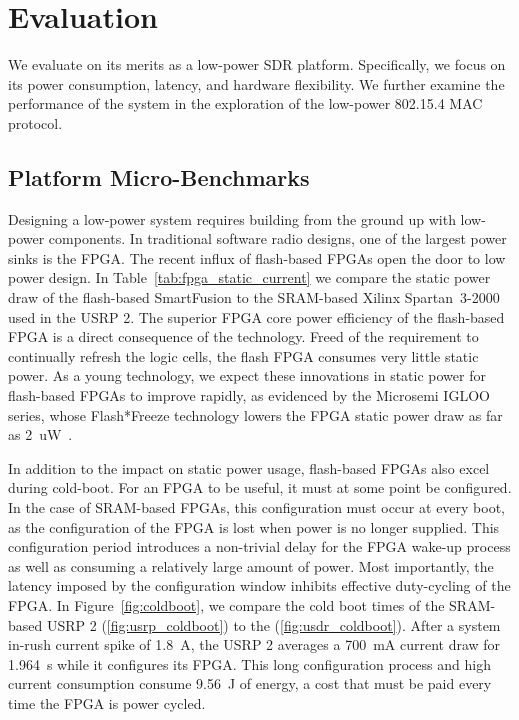 \section{Evaluation}
\label{sec:eval}

We evaluate \sdr on its merits as a low-power SDR platform. Specifically, we
focus on its power consumption, latency, and hardware flexibility. We further
examine the performance of the \sdr system in the exploration of the low-power
802.15.4 MAC protocol.

\vfill\eject

\subsection{Platform Micro-Benchmarks}
Designing a low-power system requires building from the ground up with
low-power components. In traditional software radio designs, one of the
largest power sinks is the FPGA. The recent influx of flash-based FPGAs open
the door to low power design. In Table~\ref{tab:fpga_static_current} we
compare the static power draw of the flash-based SmartFusion to the SRAM-based
Xilinx Spartan~3-2000 used in the USRP 2. The superior FPGA core power
efficiency of the flash-based FPGA is a direct consequence of the technology.
Freed of the requirement to continually refresh the logic cells, the flash
FPGA consumes very little static power. As a young technology, we expect these
innovations in static power for flash-based FPGAs to improve rapidly, as
evidenced by the Microsemi IGLOO series, whose Flash*Freeze technology lowers
the FPGA static power draw as far as 2~uW~\cite{igloo}.

In addition to the impact on static power usage, flash-based FPGAs also excel
during cold-boot. For an FPGA to be useful, it must at some point be
configured. In the case of SRAM-based FPGAs, this configuration must occur at
every boot, as the configuration of the FPGA is lost when power is no longer
supplied. This configuration period introduces a non-trivial delay for the
FPGA wake-up process as well as consuming a relatively large amount of power.
Most importantly, the latency imposed by the configuration window inhibits
effective duty-cycling of the FPGA. In Figure~\ref{fig:coldboot}, we compare
the cold boot times of the SRAM-based USRP 2 (\ref{fig:usrp_coldboot}) to the
\sdr (\ref{fig:usdr_coldboot}). After a system in-rush current spike of
1.8~A, the USRP 2 averages a 700~mA current draw for 1.964~s while it
configures its FPGA. This long configuration process and high current
consumption consume 9.56~J of energy, a cost that must be paid every time the
FPGA is power cycled.

